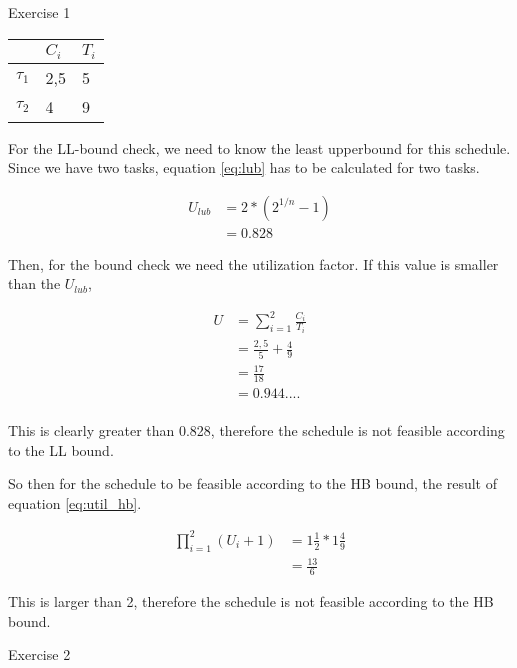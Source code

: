 \begin{homeworkProblem}
\label{sec:hapi}

\begin{homeworkSection}{Exercise 1}
\begin{tabular}{l|l|l}
	& $C_i$ & $T_i$ \\
	\hline
	$\tau_1$ & 2,5 & 5 \\
	\hline
	$\tau_2$ & 4 & 9 \\
\end{tabular}

For the LL-bound check, we need to know the least upperbound for this schedule. Since we have two tasks, equation \ref{eq:lub} has to be calculated for two tasks.

\begin{equation} \label{eq:lub}
\begin{split}
U_{lub} &= 2*(2^{1/n}-1)\\
		&= 0.828
\end{split}
\end{equation}

Then, for the bound check we need the utilization factor. If this value is smaller than the $U_{lub}$, 

\begin{equation} \label{eq:util}
\begin{split}
U 	& = \sum_{i=1}^2 \frac{C_i}{T_i} \\
	& = \frac{2,5}{5} + \frac{4}{9}\\
	& = \frac{17}{18}\\
	& = 0.944....\\
\end{split}
\end{equation}

This is clearly greater than 0.828, therefore the schedule is not feasible according to the LL bound.

So then for the schedule to be feasible according to the HB bound, the result of equation \ref{eq:util_hb}.

\begin{equation} \label{eq:util_hb}
\begin{split}
\prod_{i=1}^{2} (U_{i} + 1) & = 1\frac{1}{2} * 1\frac{4}{9} \\
		& = \frac{13}{6}	
\end{split} 	
\end{equation} 

This is larger than 2, therefore the schedule is not feasible according to the HB bound.

\end{homeworkSection}

\begin{homeworkSection}{Exercise 2}
	
\end{homeworkSection}

\end{homeworkProblem}